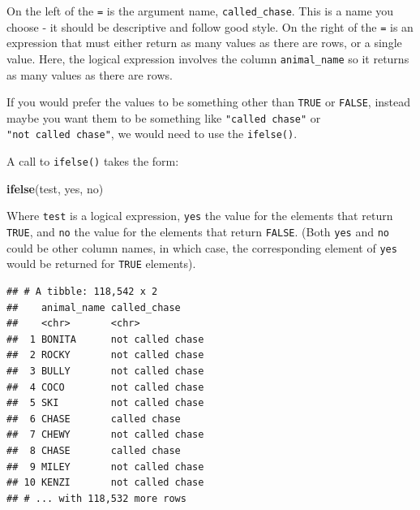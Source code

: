 \documentclass[]{Nemilov}
\newenvironment{Shaded}{\begin{snugshade}}{\end{snugshade}}
\newcommand{\DataTypeTok}[1]{\textcolor[rgb]{0.13,0.29,0.53}{#1}}
\newcommand{\KeywordTok}[1]{\textcolor[rgb]{0.13,0.29,0.53}{\textbf{#1}}}
\newcommand{\NormalTok}[1]{#1}
\newcommand{\OperatorTok}[1]{\textcolor[rgb]{0.81,0.36,0.00}{\textbf{#1}}}
\newcommand{\StringTok}[1]{\textcolor[rgb]{0.31,0.60,0.02}{#1}}
\begin{document}
On the left of the \texttt{=} is the argument name, \texttt{called\_chase}. This is a name you choose - it should be descriptive and follow good style. On the right of the \texttt{=} is an expression that must either return as many values as there are rows, or a single value. Here, the logical expression involves the column \texttt{animal\_name} so it returns as many values as there are rows.

If you would prefer the values to be something other than \texttt{TRUE} or \texttt{FALSE}, instead maybe you want them to be something like \texttt{"called\ chase"} or \texttt{"not\ called\ chase"}, we would need to use the \texttt{ifelse()}.

A call to \texttt{ifelse()} takes the form:

\begin{Shaded}
\begin{Highlighting}[]
\KeywordTok{ifelse}\NormalTok{(test, yes, no)}
\end{Highlighting}
\end{Shaded}

Where \texttt{test} is a logical expression, \texttt{yes} the value for the elements that return \texttt{TRUE}, and \texttt{no} the value for the elements that return \texttt{FALSE}. (Both \texttt{yes} and \texttt{no} could be other column names, in which case, the corresponding element of \texttt{yes} would be returned for \texttt{TRUE} elements).

\begin{Shaded}
\end{Shaded}

\begin{verbatim}
## # A tibble: 118,542 x 2
##    animal_name called_chase    
##    <chr>       <chr>           
##  1 BONITA      not called chase
##  2 ROCKY       not called chase
##  3 BULLY       not called chase
##  4 COCO        not called chase
##  5 SKI         not called chase
##  6 CHASE       called chase    
##  7 CHEWY       not called chase
##  8 CHASE       called chase    
##  9 MILEY       not called chase
## 10 KENZI       not called chase
## # ... with 118,532 more rows
\end{verbatim}
\end{document}
